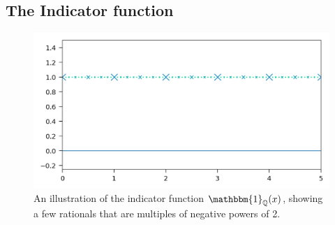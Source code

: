 

\subsection{The Indicator function}
\begin{figure}[ht]
	\centering
	\includegraphics{Code/Rational.png}
	\caption{An illustration of the indicator function $\mathbbm{1}_\Q(x)$, showing a few rationals that are multiples of negative powers of 2.}
	\label{fig:rational}
\end{figure}